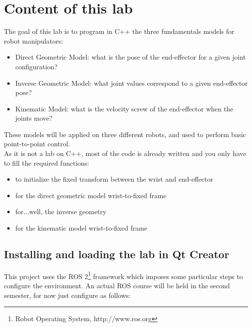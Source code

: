 \documentclass{ecnreport}
\begin{document}
  
  
  \section{Content of this lab}
  
  The goal of this lab is to program in C++ the three fundamentals models for robot manipulators:
  \begin{itemize}
    \item Direct Geometric Model: what is the pose of the end-effector for a given joint configuration?
    \item Inverse Geometric Model: what joint values correspond to a given end-effector pose?
    \item Kinematic Model: what is the velocity screw of the end-effector when the joints move?
  \end{itemize}
  These models will be applied on three different robots, and used to perform basic point-to-point control.\\
  
  As it is not a lab on C++, most of the code is already written and you only have to fill the required functions:
  \begin{itemize}
    \item {} to initialize the fixed transform between the wrist and end-effector
    \item {} for the direct geometric model wrist-to-fixed frame
    \item {} for...well, the inverse geometry
    \item {} for the kinematic model wrist-to-fixed frame
  \end{itemize}
  
  \subsection{Installing and loading the lab in Qt Creator}
  
  This project uses the ROS 2\footnote{Robot Operating System, http://www.ros.org} framework which imposes some particular steps to configure the environment. An actual ROS course will be held in the second semester, for now just configure as follows:
\end{document}
